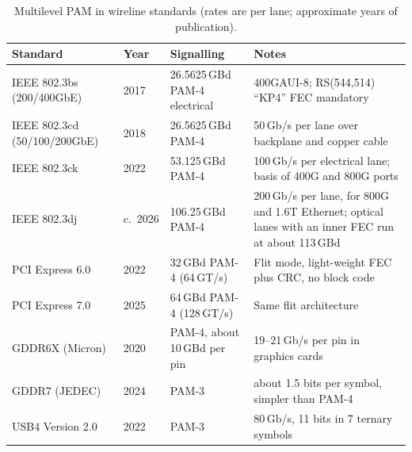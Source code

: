\begin{table}[htbp]\centering\small
\caption{Multilevel PAM in wireline standards (rates are per lane; approximate years of
publication).}
\label{tab:ch08:pam4}
\begin{tabularx}{\linewidth}{@{}l l l X@{}}
\toprule
Standard & Year & Signalling & Notes\\
\midrule
IEEE 802.3bs (200/400GbE) & 2017 & 26.5625\,GBd PAM-4 electrical & 400GAUI-8; RS(544,514) ``KP4'' FEC mandatory\\
IEEE 802.3cd (50/100/200GbE) & 2018 & 26.5625\,GBd PAM-4 & 50\,Gb/s per lane over backplane and copper cable\\
IEEE 802.3ck & 2022 & 53.125\,GBd PAM-4 & 100\,Gb/s per electrical lane; basis of 400G and 800G ports\\
IEEE 802.3dj & c.\ 2026 & 106.25\,GBd PAM-4 & 200\,Gb/s per lane, for 800G and 1.6T Ethernet; optical lanes with an inner FEC run at about 113\,GBd\\
PCI Express 6.0 & 2022 & 32\,GBd PAM-4 (64\,GT/s) & Flit mode, light-weight FEC plus CRC, no block code\\
PCI Express 7.0 & 2025 & 64\,GBd PAM-4 (128\,GT/s) & Same flit architecture\\
GDDR6X (Micron) & 2020 & PAM-4, about 10\,GBd per pin & 19--21\,Gb/s per pin in graphics cards\\
GDDR7 (JEDEC) & 2024 & PAM-3 & about 1.5 bits per symbol, simpler than PAM-4\\
USB4 Version 2.0 & 2022 & PAM-3 & 80\,Gb/s, 11 bits in 7 ternary symbols\\
\bottomrule
\end{tabularx}
\end{table}


